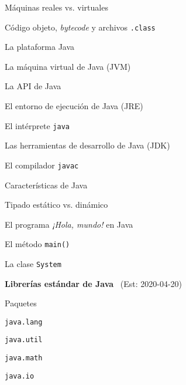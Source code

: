\begin{longenum}
\begin{longenum}
\begin{longenum}
            \item Máquinas reales vs. virtuales
            \item Código objeto, \textit{bytecode} y archivos \texttt{.class}
            \item La plataforma Java
            \begin{longenum}
                \item La máquina virtual de Java (JVM)
                \item La API de Java
            \end{longenum}
            \item El entorno de ejecución de Java (JRE)
            \begin{longenum}
                \item El intérprete \texttt{java}
            \end{longenum}
            \item Las herramientas de desarrollo de Java (JDK)
            \begin{longenum}
                \item El compilador \texttt{javac}
            \end{longenum}
        \end{longenum}
        \item Características de Java
        \item Tipado estático vs. dinámico
        \item El programa \textit{¡Hola, mundo!} en Java
        \begin{longenum}
            \item El método \texttt{main()}
            \item La clase \texttt{System}
        \end{longenum}
    \end{longenum}
    \item \textbf{Librerías estándar de Java} \ (Est: 2020-04-20)
    \begin{longenum}
        \item Paquetes
        \item \texttt{java.lang}
        \item \texttt{java.util}
        \item \texttt{java.math}
        \item \texttt{java.io}
    \end{longenum}
\end{longenum}
